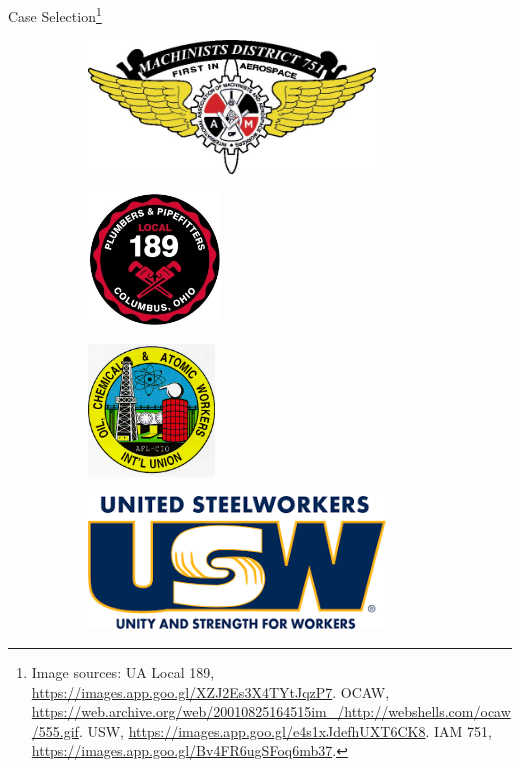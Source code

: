 \documentclass{beamer}
\begin{document}
\begin{frame}{Case Selection\footnote{Image sources: UA Local 189, \url{https://images.app.goo.gl/XZJ2Es3X4TYtJqzP7}. OCAW, \url{https://web.archive.org/web/20010825164515im_/http://webshells.com/ocaw/555.gif}. USW, \url{https://images.app.goo.gl/e4s1xJdefhUXT6CK8}. IAM 751, \url{https://images.app.goo.gl/Bv4FR6ugSFoq6mb37}.}}
\begin{figure}
\begin{subfigure}[th!]{0.2\linewidth}
  \centering 
  \includegraphics[height=100pt]{IAM_751}
\end{subfigure}
\begin{subfigure}[th!]{0.2\linewidth}
  \centering
  \includegraphics[height=100pt]{UA_189}
\end{subfigure}%
\begin{subfigure}[th!]{0.2\linewidth}
  \centering
  \includegraphics[height=100pt]{OCAW}
\end{subfigure}
\begin{subfigure}[th!]{0.2\linewidth}
  \centering
  \includegraphics[height=100pt]{USW}
\end{subfigure}%
\end{figure}


\end{frame}
\end{document}
